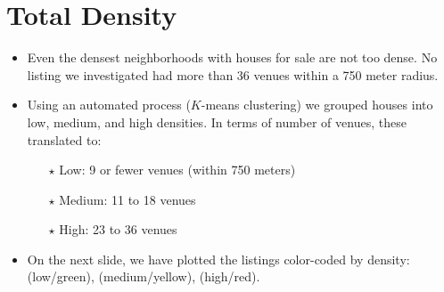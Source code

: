 \documentclass{beamer}
\begin{document}
\section{Total Density}
\begin{frame}
    \begin{itemize}
        \item Even the densest neighborhoods with houses for sale are not too dense. No listing we investigated had more than 36 venues within a 750 meter radius. \pause
        \item Using an automated process ($K$-means clustering) we grouped houses into low, medium, and high densities.\pause 
            In terms of number of venues, these translated to:
            \begin{itemize}
                \item[$\star$] Low: 9 or fewer venues (within 750 meters)
                \item[$\star$] Medium: 11 to 18 venues
                \item[$\star$] High: 23 to 36 venues \pause
            \end{itemize}
            
        \item On the next slide, we have plotted the listings color-coded by density: 
            (low/green), (medium/yellow), (high/red).
    \end{itemize}
\end{frame}

%
\end{document}
